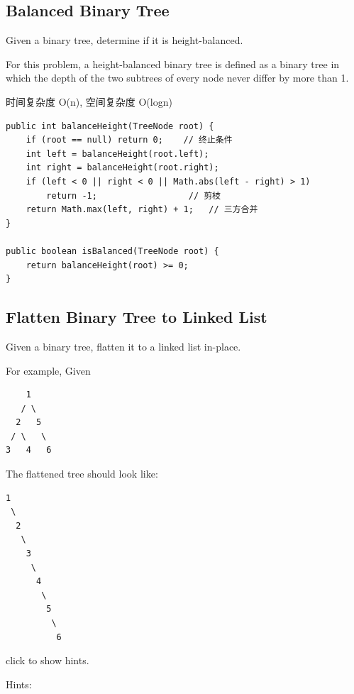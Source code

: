 \documentclass[12pt]{book}
\begin{document}
\subsection{Balanced Binary Tree}
\label{sec-4-2-10}
Given a binary tree, determine if it is height-balanced.

For this problem, a height-balanced binary tree is defined as a binary tree in which the depth of the two subtrees of every node never differ by more than 1.

时间复杂度 O(n), 空间复杂度 O(logn)

\lstset{language=java,label= ,caption= ,numbers=none}
\begin{lstlisting}
public int balanceHeight(TreeNode root) {
    if (root == null) return 0;    // 终止条件
    int left = balanceHeight(root.left);
    int right = balanceHeight(root.right);
    if (left < 0 || right < 0 || Math.abs(left - right) > 1)
        return -1;                  // 剪枝
    return Math.max(left, right) + 1;   // 三方合并
}

public boolean isBalanced(TreeNode root) {
    return balanceHeight(root) >= 0;
}
\end{lstlisting}

\subsection{Flatten Binary Tree to Linked List}
\label{sec-4-2-11}
Given a binary tree, flatten it to a linked list in-place.

For example, Given
\lstset{language=java,label= ,caption= ,numbers=none}
\begin{lstlisting}
    1
   / \
  2   5
 / \   \
3   4   6
\end{lstlisting}

The flattened tree should look like:
\lstset{language=java,label= ,caption= ,numbers=none}
\begin{lstlisting}
1
 \
  2
   \
    3
     \
      4
       \
        5
         \
          6
\end{lstlisting}
click to show hints.

Hints:
\end{document}
